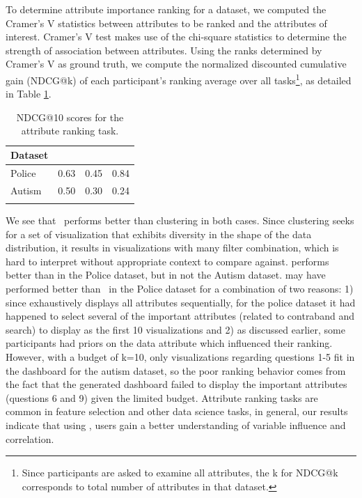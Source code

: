 To determine attribute importance ranking for a dataset, we computed the Cramer's V statistics between attributes to be ranked and the attributes of interest. Cramer's V test makes use of the chi-square statistics to determine the strength of association between attributes. Using the ranks determined by Cramer's V as ground truth, we compute the normalized discounted cumulative gain (NDCG@k) of each participant's ranking average over all tasks\footnote{Since participants are asked to examine all attributes, the k for NDCG@k corresponds to total number of attributes in that dataset.}, as detailed in Table \ref{table:ndcg_ranking_result}. 
\begin{table}[ht!]
	\centering
	\begin{tabular}{lrrr}
	\hline
	 Dataset   &   \system &   \cluster &   \BFS \\
	\hline
	 Police    &      0.63 &      0.45 &  0.84 \\
	 Autism    &      0.50 &      0.30 &  0.24 \\
	\hline
	\label{table:ndcg_ranking_result}
	\end{tabular}
	\caption{NDCG@10 scores for the attribute ranking task.}
	\vspace{-10pt}
\end{table}
We see that \system\ performs better than clustering in both cases. Since clustering seeks for a set of visualization that exhibits diversity in the shape of the data distribution, it results in visualizations with many filter combination, which is hard to interpret without appropriate context to compare against. \BFS performs better than \system in the Police dataset, but in not the Autism dataset. \BFS may have performed better than \system\ in the Police dataset for a combination of two reasons: 1) since \BFS exhaustively displays all attributes sequentially, for the police dataset it had happened to select several of the important attributes (related to contraband and search) to display as the first 10 visualizations and 2) as discussed earlier, some participants had priors on the data attribute which influenced their ranking. However, with a budget of k=10, only visualizations regarding questions 1-5 fit in the dashboard for the autism dataset, so the poor ranking behavior comes from the fact that the \BFS generated dashboard failed to display the important attributes (questions 6 and 9) given the limited budget. 
\npar Attribute ranking tasks are common in feature selection and other data science tasks, in general, our results indicate that using \system, users gain a better understanding of variable influence and correlation. 

